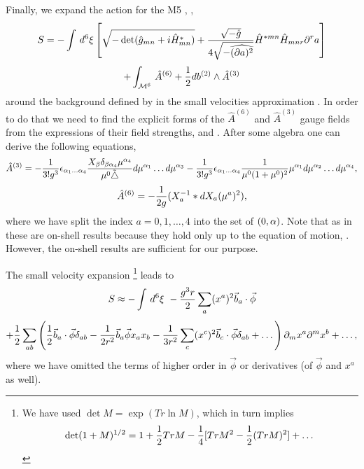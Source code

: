 \documentclass[a4paper,11pt]{article}
\begin{document}
Finally, we expand the action for the M5 \cite{pst},
\cite{blnpst}, \cite{apps}
\begin{equation}\plabel{M5ac}
S=-\int\,d^6 \xi \left[\sqrt{-\det (\hat{g}_{mn}+i\hat{H}_{mn}^{*})}+
{\sqrt{-\hat{g}}\over 4\sqrt{-\widehat{(\partial a)^2}}}\hat{H}^{*mn}\hat{H}_{mnr}
\partial^r a \right]
\end{equation}
$$
+\int_{{\cal M}^6}\, \hat{A}^{(6)}+{1\over 2}db^{(2)}\wedge \hat{A}^{(3)}
$$
around the background defined by  in the small velocities approximation
\cite{ckktp}. In order to do that we need to find the
explicit forms of the
$\hat{A}^{(6)}$ and $\hat{A}^{(3)}$ gauge fields from the expressions of their field
strengths,  and . After some algebra one can derive
the following equations,
\begin{equation}\plabel{A3}
\hat{A}^{(3)}=-{1\over 3!g^3}\e_{\a_1\dots
\a_4}{X_{\b}\d_{\b\a_4}\mu^{\a_4} \over
\mu^{0}\tilde{\triangle}}d\mu^{\a_1}\dots d\mu^{\a_3} -{1\over
3!g^3}\e_{\a_1\dots \a_4}{1\over \mu^0 (1+\mu^0)^2}\mu^{\a_1}
d\mu^{\a_2}\dots d\mu^{\a_4} ,
\end{equation}
\begin{equation}\plabel{A6}
\hat{A}^{(6)}=-{1\over 2g}(X^{-1}_{a}\ast dX_{a}(\mu^{a})^2),
\end{equation}
where we have split the index $a=0,1,\dots,4$ into the set of
$(0,\alpha)$. Note that as in \cite{tran} these are on-shell results
because they hold only up to the equation of motion, .
However, the on-shell results are sufficient for our purpose.

The small velocity expansion
\footnote{We have used
$\det M=\exp(Tr \ln M)$, which in turn implies
$$
\det (1+M)^{1/2}=1+{1\over 2}Tr M-{1\over 4}[Tr M^2-{1\over 2}(Tr M)^2]+\dots
$$}
leads to
$$
S\approx -\int\,d^6\xi~-{g^3 r\over 2}\sum_a (x^a)^2 \vec{b}_a\cdot \vec{\phi}
$$
\begin{equation}\plabel{M5exp}
+{1\over 2}\sum_{ab}\left({1\over 2}\vec{b}_a\cdot \vec{\phi}\d_{ab}
-{1\over 2r^2}\vec{b}_a\vec{\phi}x_a x_b-{1\over 3r^2}\sum_c (x^c)^2
\vec{b}_c \cdot \vec{\phi}\d_{ab}+\dots \right)\partial_m x^a \partial^m x^b
+\dots,
\end{equation}
where we have omitted the terms of higher order in $\vec{\phi}$ or
derivatives (of $\vec{\phi}$ and $x^a$ as well).
\end{document}
